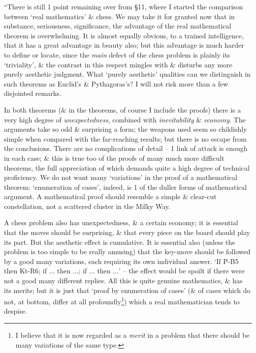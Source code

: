 \documentclass{article}
\numberwithin{equation}{section}
\begin{document}
 ``There is still 1 point remaining over from \S11, where I started the comparison between `real mathematics' \& chess. We may take it for granted now that in substance, seriousness, significance, the advantage of the real mathematical theorem is overwhelming. It is almost equally obvious, to a trained intelligence, that it has a great advantage in beauty also; but this advantage is much harder to define or locate, since the \textit{main} defect of the chess problem is plainly its `triviality', \& the contrast in this respect mingles with \& disturbs any more purely aesthetic judgment. What `purely aesthetic' qualities can we distinguish in such theorems as Euclid's \& Pythagoras's? I will not risk more than a few disjointed remarks.

In both theorems (\& in the theorems, of course I include the proofs) there is a very high degree of \textit{unexpectedness}, combined with \textit{inevitability} \& \textit{economy}. The arguments take so odd \& surprising a form; the weapons used seem so childishly simple when compared with the far-reaching results; but there is no escape from the conclusions. There are no complications of detail -- 1 link of attack is enough in each case; \& this is true too of the proofs of many much more difficult theorems, the full appreciation of which demands quite a high degree of technical proficiency. We do not want many `variations' in the proof of a mathematical theorem: `enumeration of cases', indeed, is 1 of the duller forms of mathematical argument. A mathematical proof should resemble a simple \& clear-cut constellation, not a scattered cluster in the Milky Way.

A chess problem also has unexpectedness, \& a certain economy; it is essential that the moves should be surprising, \& that every piece on the board should play its part. But the aesthetic effect is cumulative. It is essential also (unless the problem is too simple to be really amusing) that the key-move should be followed by a good many variations, each requiring its own individual answer. `If P-B5 then Kt-R6; if $\ldots$ then $\ldots$; if $\ldots$ then $\ldots$' -- the effect would be spoilt if there were not a good many different replies. All this is quite genuine mathematics, \& has its merits; but it is just that `proof by enumeration of cases' (\& of cases which do not, at bottom, differ at all profoundly\footnote{I believe that it is now regarded as a \textit{merit} in a problem that there should be many variations of the same type.}) which a real mathematician tends to despise.
\end{document}

